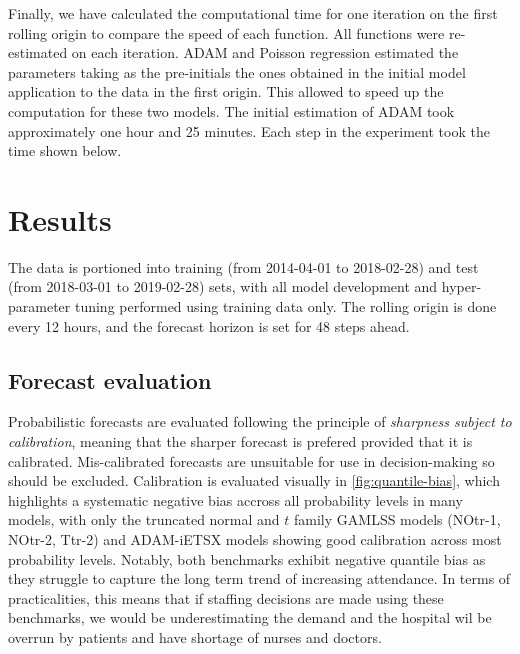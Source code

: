 \documentclass[]{elsarticle} %
\begin{document}
Finally, we have calculated the computational time for one iteration on the first rolling origin to compare the speed of each function. All functions were re-estimated on each iteration. ADAM and Poisson regression estimated the parameters taking as the pre-initials the ones obtained in the initial model application to the data in the first origin. This allowed to speed up the computation for these two models. The initial estimation of ADAM took approximately one hour and 25 minutes. Each step in the experiment took the time shown below.

\hypertarget{results}{%
\section{Results}\label{results}}

The data is portioned into training (from 2014-04-01 to 2018-02-28) and test (from 2018-03-01 to 2019-02-28) sets, with all model development and hyper-parameter tuning performed using training data only. The rolling origin is done every 12 hours, and the forecast horizon is set for 48 steps ahead.

\hypertarget{forecast-evaluation}{%
\subsection{Forecast evaluation}\label{forecast-evaluation}}

Probabilistic forecasts are evaluated following the principle of \emph{sharpness subject to calibration}, meaning that the sharper forecast is prefered provided that it is calibrated. Mis-calibrated forecasts are unsuitable for use in decision-making so should be excluded. Calibration is evaluated visually in \ref{fig:quantile-bias}, which highlights a systematic negative bias accross all probability levels in many models, with only the truncated normal and \(t\) family GAMLSS models (NOtr-1, NOtr-2, Ttr-2) and ADAM-iETSX models showing good calibration across most probability levels. Notably, both benchmarks exhibit negative quantile bias as they struggle to capture the long term trend of increasing attendance. In terms of practicalities, this means that if staffing decisions are made using these benchmarks, we would be underestimating the demand and the hospital wil be overrun by patients and have shortage of nurses and doctors.
\end{document}
